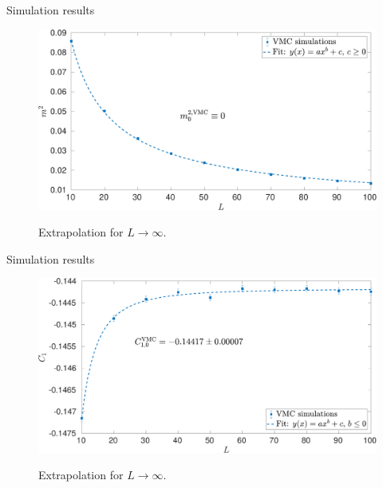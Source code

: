 \documentclass[10pt, compress, protectframetitle, handout]{beamer}
\begin{document}
\begin{frame}{Simulation results}

	\begin{figure}
		\centering
		\includegraphics[width=\textwidth]{m2_VMC}
		\label{fig:m2_VMC}
		\caption{Extrapolation for $L \to \infty$.}
	\end{figure}
	
\end{frame}

\begin{frame}{Simulation results}

	\begin{figure}
		\centering
		\includegraphics[width=\textwidth]{C1_VMC}
		\label{fig:C1_VMC}
		\caption{Extrapolation for $L \to \infty$.}
	\end{figure}
	
\end{frame}
\end{document}
